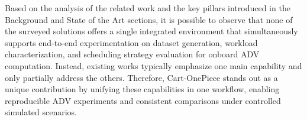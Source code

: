 Based on the analysis of the related work and the key pillars introduced in the Background and State of the Art sections, it is possible to observe that none of the surveyed solutions offers a single integrated environment that simultaneously supports end-to-end experimentation on dataset generation, workload characterization, and scheduling strategy evaluation for onboard ADV computation. Instead, existing works typically emphasize one main capability and only partially address the others. Therefore, Cart-OnePiece stands out as a unique contribution by unifying these capabilities in one workflow, enabling reproducible ADV experiments and consistent comparisons under controlled simulated scenarios.

